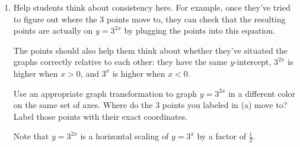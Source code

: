 \documentclass{article}
\begin{document}
\begin{enumerate}
\begin{enumerate}
\begin{solution}
      \begin{center}
      \end{center}
\end{solution}

  \item

    \begin{workshop}
      Help students think about consistency here. For example, once they've tried to figure out where the 3 points move to, they can check that the resulting points are actually on $y = 3^{2x}$ by plugging the points into this equation.

      The points should also help them think about whether they've situated the graphs correctly relative to each other: they have the same $y$-intercept, $3^{2x}$ is higher when $x > 0$, and $3^x$ is higher when $x < 0$. 
    \end{workshop}

    \begin{problem}[\stretch{0.25}]
      Use an appropriate graph transformation to graph $y = 3^{2x}$ in a different color on the same set of axes. Where do the 3 points you labeled in (a) move to? Label those points with their exact coordinates. 
    \end{problem}

\begin{solution}

    Note that $y=3^{2x}$ is a horizontal scaling of $y=3^x$ by a factor of $\frac{1}{2}$. 
        

\end{solution}
\end{enumerate}
\end{enumerate}
\end{document}
